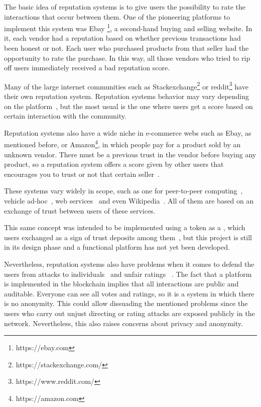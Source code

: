 The basic idea of reputation systems is to give users the possibility to rate
the interactions that occur between them. One of the pioneering platforms to
implement this system was Ebay \footnote{https://ebay.com}, a second-hand buying
and selling website. In it, each vendor had a reputation based on whether
previous transactions had been honest or not. Each user who purchased products
from that seller had the opportunity to rate the purchase. In this way, all
those vendors who tried to rip off users immediately received a bad reputation
score.

Many of the large internet communities such as
Stackexchange\footnote{https://stackexchange.com/} or
reddit\footnote{https://www.reddit.com/} have their own reputation system.
Reputation systems behavior may vary depending on the
platform~\cite{josang2002beta}, but the most usual is the one where users get a
score based on certain interaction with the community.

Reputation systems also have a wide niche in e-commerce webs such as Ebay, as
mentioned before, or Amazon\footnote{https://amazon.com}, in which people pay
for a product sold by an unknown vendor. There must be a previous trust in the
vendor before buying any product, so a reputation system offers a score given by
other users that encourages you to trust or not that certain
seller~\cite{resnick2002trust}.

These systems vary widely in scope, such as one for peer-to-peer
computing~\cite{zhou2007powertrust}, vehicle ad-hoc~\cite{dotzer2005vars}, web
services~\cite{moore2008reputation} and even Wikipedia~\cite{adler2007content}.
All of them are based on an exchange of trust between users of these services.

This same concept was intended to be implemented using a token as a , which users exchanged as a sign of trust deposits among
them~\cite{sharples2016blockchain}, but this project is still in its design
phase and a functional platform has not yet been developed.

Nevertheless, reputation systems also have problems when it comes to defend the
users from attacks to individuals~\cite{hoffman2009survey} and unfair ratings
~\cite{whitby2004filtering}. The fact that a platform is implemented in the
blockchain implies that all interactions are public and auditable. Everyone can
see all votes and ratings, so it is a system in which there is no anonymity.
This could allow dissuading the mentioned problems since the users who carry out
unjust directing or rating attacks are exposed publicly in the network.
Nevertheless, this also raises concerns about privacy and anonymity.

